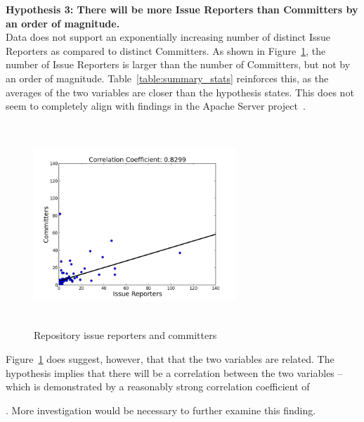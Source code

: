\documentclass{proc}
\begin{document}
{{{{{{\noindent \textbf{Hypothesis 3: There will be more Issue Reporters than Committers by an order of magnitude.}\\
Data does not support an exponentially increasing number of distinct Issue Reporters as compared to distinct Committers. 
As shown in Figure~\ref{fig:issue_reporters_committers_scatterplot}, the number of Issue Reporters is larger than the number of Committers, but not by an order of magnitude. Table~\ref{table:summary_stats} reinforces this, as the averages of the two variables are closer than the hypothesis states. This does not seem to completely align with findings in the Apache Server project~\cite{mockus2000case}. 

\begin{figure}
\includegraphics[height=3in,width=3in]{images/issue_reporters_committers_scatterplot.png}
\caption{Repository issue reporters and committers}
\label{fig:issue_reporters_committers_scatterplot}
\end{figure}

Figure~\ref{fig:issue_reporters_committers_scatterplot} does suggest, however, that that the two variables are related. The hypothesis implies that there will be a correlation between the two variables -- which is demonstrated by a reasonably strong correlation coefficient of }\unskip. More investigation would be necessary to further examine this finding.\\

}}}}}
\end{document}
